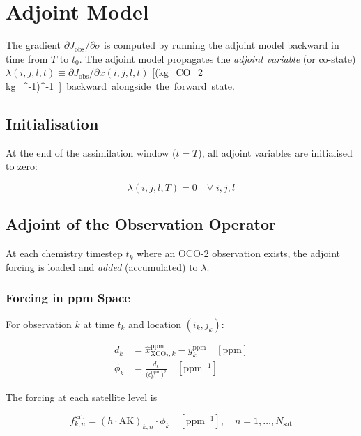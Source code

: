 \documentclass[12pt]{article}
\begin{document}
\section{Adjoint Model}

The gradient $\partial J_{\mathrm{obs}} / \partial \sigma$ is computed by running
the adjoint model backward in time from $T$ to $t_0$. The adjoint model
propagates the \emph{adjoint variable} (or co-state)
$\lambda(i,j,l,t) \equiv \partial J_{\mathrm{obs}} / \partial x(i,j,l,t)$
[\si{(kg_{CO_2}\,kg_{}^{-1})^{-1}}]
backward alongside the forward state.

\subsection{Initialisation}

At the end of the assimilation window ($t = T$), all adjoint variables are
initialised to zero:

\begin{equation}
  \lambda(i,j,l,T) = 0 \quad \forall\; i,j,l
\end{equation}

\subsection{Adjoint of the Observation Operator}

At each chemistry timestep $t_k$ where an OCO-2 observation exists, the adjoint
forcing is loaded and \emph{added} (accumulated) to $\lambda$.

\subsubsection{Forcing in ppm Space}

For observation $k$ at time $t_k$ and location $(i_k, j_k)$:

\begin{align}
  d_k &= \hat{x}_{\mathrm{XCO}_2,k}^{\mathrm{ppm}} - y_k^{\mathrm{ppm}}
         \quad [\text{ppm}] \label{eq:diff} \\
  \phi_k &= \frac{d_k}{\bigl(\epsilon_k^{\mathrm{ppm}}\bigr)^2}
         \quad [\text{ppm}^{-1}] \label{eq:force_scalar}
\end{align}

The forcing at each satellite level is

\begin{equation}
  f_{k,n}^{\mathrm{sat}} = (h \cdot \mathrm{AK})_{k,n} \cdot \phi_k
  \quad [\text{ppm}^{-1}], \quad n = 1, \ldots, N_{\mathrm{sat}}
  \label{eq:force_sat}
\end{equation}
\end{document}

